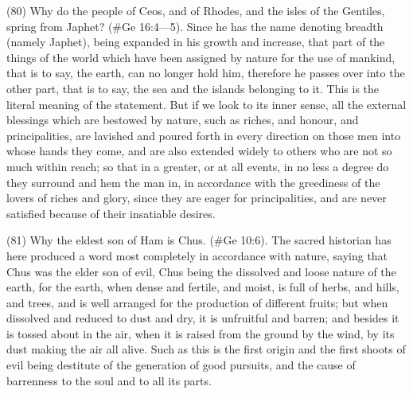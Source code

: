 (80) Why do the people of Ceos, and of Rhodes, and the isles of the Gentiles, spring from Japhet?
(\#Ge 16:4—5). Since he has the name denoting breadth (namely Japhet), being expanded in
his growth and increase, that part of the things of the world which have been assigned by nature for
the use of mankind, that is to say, the earth, can no longer hold him, therefore he passes over into
the other part, that is to say, the sea and the islands belonging to it. This is the literal meaning of
the statement. But if we look to its inner sense, all the external blessings which are bestowed by
nature, such as riches, and honour, and principalities, are lavished and poured forth in every
direction on those men into whose hands they come, and are also extended widely to others who
are not so much within reach; so that in a greater, or at all events, in no less a degree do they
surround and hem the man in, in accordance with the greediness of the lovers of riches and glory,
since they are eager for principalities, and are never satisfied because of their insatiable desires.

(81) Why the eldest son of Ham is Chus. (\#Ge 10:6). The sacred historian has here produced
a word most completely in accordance with nature, saying that Chus was the elder son of evil,
Chus being the dissolved and loose nature of the earth, for the earth, when dense and fertile, and
moist, is full of herbs, and hills, and trees, and is well arranged for the production of different fruits;
but when dissolved and reduced to dust and dry, it is unfruitful and barren; and besides it is tossed
about in the air, when it is raised from the ground by the wind, by its dust making the air all alive.
Such as this is the first origin and the first shoots of evil being destitute of the generation of good
pursuits, and the cause of barrenness to the soul and to all its parts.

